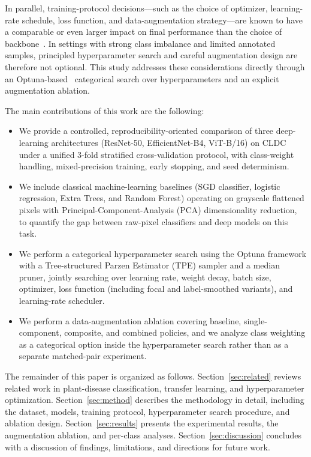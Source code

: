 \documentclass[conference]{IEEEtran}
\begin{document}
In parallel, training-protocol decisions---such as the choice of optimizer, learning-rate schedule, loss function, and data-augmentation strategy---are known to have a comparable or even larger impact on final performance than the choice of backbone~\cite{loshchilov2019adamw,loshchilov2017sgdr,lin2017focal}. In settings with strong class imbalance and limited annotated samples, principled hyperparameter search and careful augmentation design are therefore not optional. This study addresses these considerations directly through an Optuna-based~\cite{akiba2019optuna} categorical search over hyperparameters and an explicit augmentation ablation.

The main contributions of this work are the following:
\begin{itemize}
  \item We provide a controlled, reproducibility-oriented comparison of three deep-learning architectures (ResNet-50, EfficientNet-B4, ViT-B/16) on CLDC under a unified 3-fold stratified cross-validation protocol, with class-weight handling, mixed-precision training, early stopping, and seed determinism.
  \item We include classical machine-learning baselines (SGD classifier, logistic regression, Extra Trees, and Random Forest) operating on grayscale flattened pixels with Principal-Component-Analysis (PCA) dimensionality reduction, to quantify the gap between raw-pixel classifiers and deep models on this task.
  \item We perform a categorical hyperparameter search using the Optuna framework with a Tree-structured Parzen Estimator (TPE) sampler and a median pruner, jointly searching over learning rate, weight decay, batch size, optimizer, loss function (including focal and label-smoothed variants), and learning-rate scheduler.
  \item We perform a data-augmentation ablation covering baseline, single-component, composite, and combined policies, and we analyze class weighting as a categorical option inside the hyperparameter search rather than as a separate matched-pair experiment.
\end{itemize}

The remainder of this paper is organized as follows. Section~\ref{sec:related} reviews related work in plant-disease classification, transfer learning, and hyperparameter optimization. Section~\ref{sec:method} describes the methodology in detail, including the dataset, models, training protocol, hyperparameter search procedure, and ablation design. Section~\ref{sec:results} presents the experimental results, the augmentation ablation, and per-class analyses. Section~\ref{sec:discussion} concludes with a discussion of findings, limitations, and directions for future work.
\end{document}
